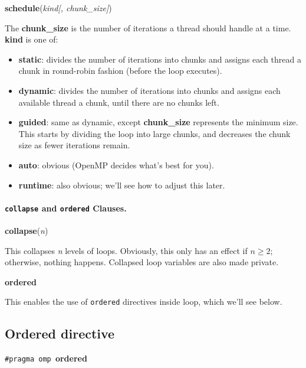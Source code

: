   \begin{center}
    {\bf schedule}({\it kind[, chunk\_size]})
  \end{center}

    The {\bf chunk\_size} is the number of iterations a thread
      should handle at a time. {\bf kind} is one of:
      \begin{itemize}
        \item {\bf static}:  divides the number of iterations into chunks and assigns each thread
        a chunk in round-robin fashion (before the loop executes).

        \item {\bf dynamic}: divides the number of iterations into chunks and assigns each
        available thread a chunk, until there are no chunks left.
        \item {\bf guided}:  same as dynamic, except {\bf chunk\_size} represents the minimum
        size. This starts by dividing the loop into large chunks, and decreases the
        chunk size as fewer iterations remain.
        \item {\bf auto}: obvious (OpenMP decides what's best for you).
        \item {\bf runtime}: also obvious; we'll see how to adjust this later.
      \end{itemize}

\paragraph{{\tt collapse} and {\tt ordered} Clauses.}

  \begin{center}
    {\bf collapse}({\it n})
  \end{center}

    This collapses {\it n} levels of loops. Obviously, this only has
    an effect if $n \ge 2$; otherwise, nothing happens. Collapsed loop
    variables are also made private.

  \begin{center}
    {\bf ordered}
  \end{center}
  
    This enables the use of {\tt ordered} directives inside loop, which we'll see below.

\subsection*{Ordered directive}
  \begin{center}
    {\tt \#pragma omp }{\bf ordered}
  \end{center}

